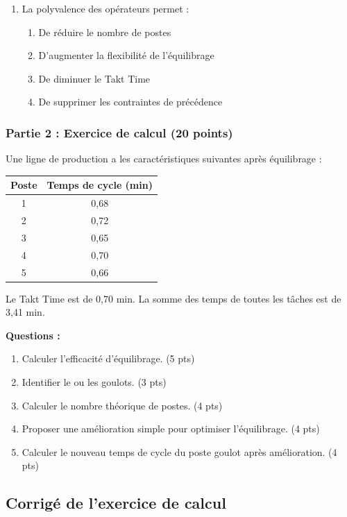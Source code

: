\documentclass[12pt,a4paper]{article}
\begin{document}
\begin{center}
\begin{enumerate}
    \item La polyvalence des opérateurs permet :
    \begin{enumerate}
        \item De réduire le nombre de postes
        \item D'augmenter la flexibilité de l'équilibrage
        \item De diminuer le Takt Time
        \item De supprimer les contraintes de précédence
    \end{enumerate}
\end{enumerate}

\subsubsection{Partie 2 : Exercice de calcul (20 points)}

Une ligne de production a les caractéristiques suivantes après équilibrage :

\begin{table}[H]
\centering
\begin{tabular}{|c|c|}
\hline
\textbf{Poste} & \textbf{Temps de cycle (min)} \\ \hline
1 & 0,68 \\
2 & 0,72 \\
3 & 0,65 \\
4 & 0,70 \\
5 & 0,66 \\
\hline
\end{tabular}
\end{table}

Le Takt Time est de 0,70 min. La somme des temps de toutes les tâches est de 3,41 min.

\textbf{Questions :}
\begin{enumerate}
    \item Calculer l'efficacité d'équilibrage. (5 pts)
    \item Identifier le ou les goulots. (3 pts)
    \item Calculer le nombre théorique de postes. (4 pts)
    \item Proposer une amélioration simple pour optimiser l'équilibrage. (4 pts)
    \item Calculer le nouveau temps de cycle du poste goulot après amélioration. (4 pts)
\end{enumerate}

\subsection{Corrigé de l'exercice de calcul}


\end{center}
\end{document}
